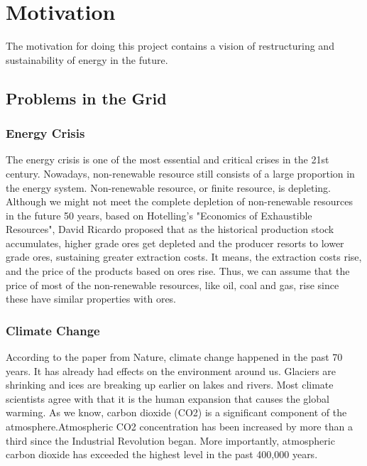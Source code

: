 \section{Motivation} %
The motivation for doing this project contains a vision of restructuring and sustainability of energy in the future.
\subsection{Problems in the Grid}
\subsubsection{Energy Crisis}
The energy crisis is one of the most essential and critical crises in the 21st century. Nowadays, non-renewable resource still consists of a large proportion in the energy system. Non-renewable resource, or finite resource, is depleting. Although we might not meet the complete depletion of non-renewable resources in the future 50 years, based on Hotelling’s "Economics of Exhaustible Resources", David Ricardo proposed that \cite{devarajan1981hotelling} as the historical production stock accumulates, higher grade ores get depleted and the producer resorts to lower grade ores, sustaining greater extraction costs. It means, the extraction costs rise, and the price of the products based on ores rise. Thus, we can assume that the price of most of the non-renewable resources, like oil, coal and gas, rise since these have similar properties with ores. 

\subsubsection{Climate Change}
According to the paper from Nature, climate change happened in the past 70 years. It has already had effects on the environment around us. Glaciers are shrinking and ices are breaking up earlier on lakes and rivers. Most climate scientists agree with that it is the human expansion that causes the global warming. As we know, carbon dioxide (CO2) is a significant component of the atmosphere.Atmospheric CO2 concentration has been increased by more than a third since the Industrial Revolution began. More importantly, atmospheric carbon dioxide has exceeded the highest level in the past 400,000 years. 

